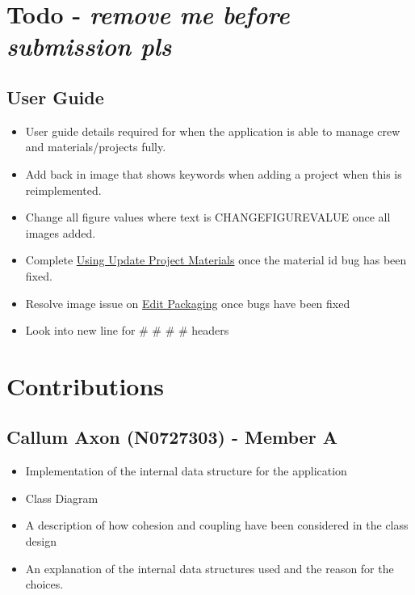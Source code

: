 \documentclass[
  english,
  a4paper,
,tablecaptionabove
]{scrartcl}
\providecommand{\tightlist}{%
  \setlength{\itemsep}{0pt}\setlength{\parskip}{0pt}}
\begin{document}
\newpage

\hypertarget{todo---remove-me-before-submission-pls}{%
\section{\texorpdfstring{Todo - \textbf{\emph{remove me before
submission
pls}}}{Todo - remove me before submission pls}}\label{todo---remove-me-before-submission-pls}}

\hypertarget{user-guide}{%
\subsection{User Guide}\label{user-guide}}

\begin{itemize}
\tightlist
\item
  User guide details required for when the application is able to manage
  crew and materials/projects fully.
\item
  Add back in image that shows keywords when adding a project when this
  is reimplemented.
\item
  Change all figure values where text is CHANGEFIGUREVALUE once all
  images added.
\item
  Complete \protect\hyperlink{using-update-project-materials}{Using
  Update Project Materials} once the material id bug has been fixed.
\item
  Resolve image issue on \protect\hyperlink{edit-packaging}{Edit
  Packaging} once bugs have been fixed
\item
  Look into new line for \# \# \# \# headers
\end{itemize}

\newpage

\hypertarget{contributions}{%
\section{Contributions}\label{contributions}}

\hypertarget{callum-axon-n0727303---member-a}{%
\subsection{Callum Axon (N0727303) - Member
A}\label{callum-axon-n0727303---member-a}}

\begin{itemize}
\tightlist
\item
  Implementation of the internal data structure for the application
\item
  Class Diagram
\item
  A description of how cohesion and coupling have been considered in the
  class design
\item
  An explanation of the internal data structures used and the reason for
  the choices.
\end{itemize}
\end{document}
